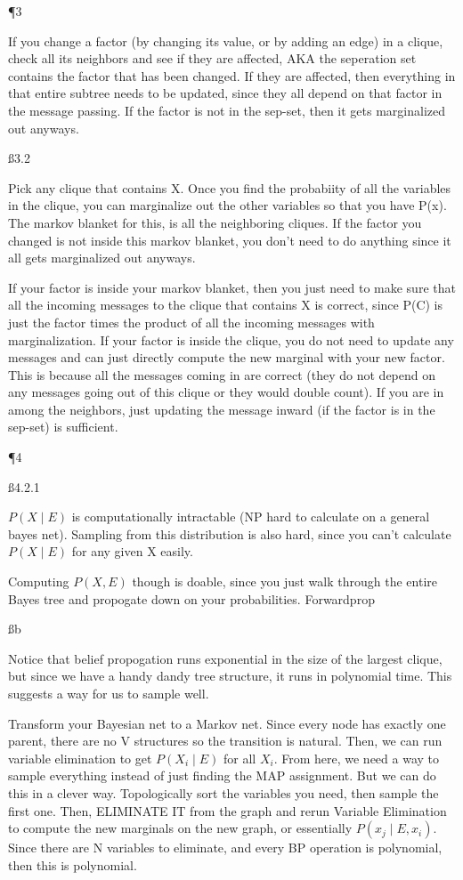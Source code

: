 \P 3

If you change a factor (by changing its value, or by adding an edge) in a clique, check all its neighbors and see if they are affected, AKA the seperation set contains the factor that has been changed. If they are affected, then everything in that entire subtree needs to be updated, since they all depend on that factor in the message passing. If the factor is not in the sep-set, then it gets marginalized out anyways.

\ss{3.2}

Pick any clique that contains X. Once you find the probabiity of all the variables in the clique, you can marginalize out the other variables so that you have P(x). The markov blanket for this, is all the neighboring cliques. If the factor you changed is not inside this markov blanket, you don't need to do anything since it all gets marginalized out anyways.

If your factor is inside your markov blanket, then you just need to make sure that all the incoming messages to the clique that contains X is correct, since P(C) is just the factor times the product of all the incoming messages with marginalization. If your factor is inside the clique, you do not need to update any messages and can just directly compute the new marginal with your new factor. This is because all the messages coming in are correct (they do not depend on any messages going out of this clique or they would double count). If you are in among the neighbors, just updating the message inward (if the factor is in the sep-set) is sufficient.

\P 4

\ss{4.2.1}

$P(X \mid E)$ is computationally intractable (NP hard to calculate on a general bayes net). Sampling from this distribution is also hard, since you can't calculate $P(X \mid E)$ for any given X easily.

Computing $P(X,E)$ though is doable, since you just walk through the entire Bayes tree and propogate down on your probabilities. Forwardprop

\ss b

Notice that belief propogation runs exponential in the size of the largest clique, but since we have a handy dandy tree structure, it runs in polynomial time. This suggests a way for us to sample well.

Transform your Bayesian net to a Markov net. Since every node has exactly one parent, there are no V structures so the transition is natural. Then, we can run variable elimination to get $P(X_i \mid E)$ for all $X_i$. From here, we need a way to sample everything instead of just finding the MAP assignment. But we can do this in a clever way. Topologically sort the variables you need, then sample the first one. Then, ELIMINATE IT from the graph and rerun Variable Elimination to compute the new marginals on the new graph, or essentially $P(x_j \mid E,x_i)$. Since there are N variables to eliminate, and every BP operation is polynomial, then this is polynomial.

